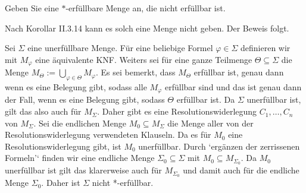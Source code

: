 
\begin{exercise}[26]

Geben Sie eine $\ast$-erfüllbare Menge an, die nicht erfüllbar ist.

\end{exercise}


\begin{solution}
Nach Korollar II.3.14 kann es solch eine Menge nicht geben. Der Beweis folgt.

Sei $\Sigma$ eine unerfüllbare Menge. Für eine beliebige Formel $\varphi \in \Sigma$ definieren wir mit $M_\varphi$ eine äquivalente KNF. Weiters sei für eine ganze Teilmenge $\Theta \subseteq \Sigma$ die Menge $M_\Theta := \bigcup_{\varphi \in \Theta} M_\varphi$. Es sei bemerkt, dass $M_\Theta$ erfüllbar ist, genau dann wenn es eine Belegung gibt, sodass alle $M_\varphi$ erfüllbar sind und das ist genau dann der Fall, wenn es eine Belegung gibt, sodass $\Theta$ erfüllbar ist. Da $\Sigma$ unerfüllbar ist, gilt das also auch für $M_\Sigma$. Daher gibt es eine Resolutionswiderlegung $C_1, \dots, C_n$ von $M_\Sigma$. Sei die endlichen Menge $M_0 \subseteq M_\Sigma$ die Menge aller von der Resolutionswiderlegung verwendeten Klauseln. Da es für $M_0$ eine Resolutionswiderlegung gibt, ist $M_0$ unerfüllbar. Durch `ergänzen der zerrissenen Formeln'` finden wir eine endliche Menge $\Sigma_0 \subseteq \Sigma$ mit $M_0 \subseteq M_{\Sigma_0}$. Da $M_0$ unerfüllbar ist gilt das klarerweise auch für $M_{\Sigma_0}$ und damit auch für die endliche Menge $\Sigma_0$. Daher ist $\Sigma$ nicht *-erfüllbar.

\end{solution}

